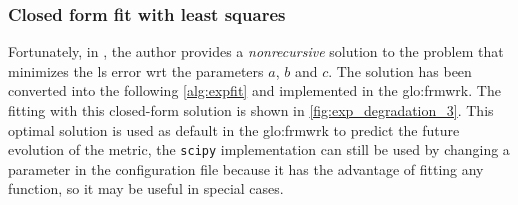 \subsubsection{Closed form fit with least squares}
Fortunately, in \cite{Exp_fit}, the author provides a \emph{nonrecursive} solution to the problem that minimizes the \gls{ls} error \gls{wrt} the parameters $a$, $b$ and $c$. The solution has been converted into the following \autoref{alg:expfit} and implemented in the \gls{glo:frmwrk}. The fitting with this closed-form solution is shown in \autoref{fig:exp_degradation_3}. This optimal solution is used as default in the \gls{glo:frmwrk} to predict the future evolution of the metric, the \texttt{scipy} implementation can still be used by changing a parameter in the configuration file because it has the advantage of fitting any function, so it may be useful in special cases.

